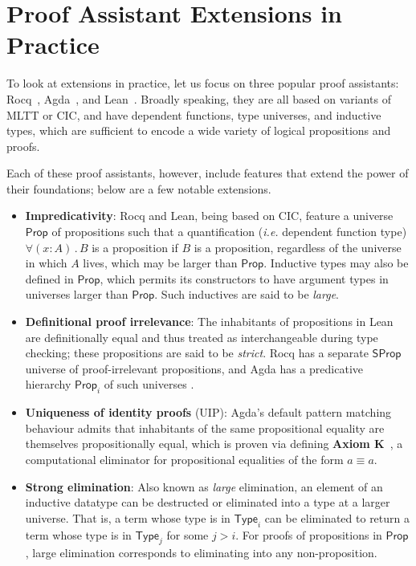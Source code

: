 \documentclass{article}
\makeatletter
\newcommand{\ie}{\textit{i.e.}\@\xspace}
\newcommand{\kw}[1]{\mathsf{#1}}
\makeatother
\begin{document}
\section{Proof Assistant Extensions in Practice} \label{sec:extensions}

To look at extensions in practice,
let us focus on three popular proof assistants:
Rocq~\citep{coq}, Agda~\citep{agda}, and Lean~\citep{lean}.
Broadly speaking, they are all based on variants of MLTT or CIC,
and have dependent functions, type universes, and inductive types,
which are sufficient to encode a wide variety of logical propositions and proofs.

Each of these proof assistants, however,
include features that extend the power of their foundations;
below are a few notable extensions.

\begin{itemize}[noitemsep,topsep=0pt]
  \item \textbf{Impredicativity}: Rocq and Lean, being based on CIC,
    feature a universe $\kw{Prop}$ of propositions such that
    a quantification (\ie dependent function type) $\forall (x : A) \mathpunct{.} B$
    is a proposition if $B$ is a proposition,
    regardless of the universe in which $A$ lives,
    which may be larger than $\kw{Prop}$.
    Inductive types may also be defined in $\kw{Prop}$,
    which permits its constructors to have argument types
    in universes larger than $\kw{Prop}$.
    Such inductives are said to be \emph{large}.
  \item \textbf{Definitional proof irrelevance}:
    The inhabitants of propositions in Lean are definitionally equal
    and thus treated as interchangeable during type checking;
    these propositions are said to be \emph{strict}.
    Rocq has a separate $\kw{SProp}$ universe of proof-irrelevant propositions,
    and Agda has a predicative hierarchy $\kw{Prop}_i$ of such universes \citep{sprop}.
  \item \textbf{Uniqueness of identity proofs} (UIP):
    Agda's default pattern matching behaviour admits
    that inhabitants of the same propositional equality
    are themselves propositionally equal,
    which is proven via defining \textbf{Axiom K}~\citep{axiomk},
    a computational eliminator for propositional equalities of the form $a \equiv a$.
  \item \textbf{Strong elimination}:
    Also known as \emph{large} elimination,
    an element of an inductive datatype can be destructed or eliminated
    into a type at a larger universe.
    That is, a term whose type is in $\kw{Type}_i$
    can be eliminated to return a term whose type is in $\kw{Type}_j$
    for some $j > i$.
    For proofs of propositions in $\kw{Prop}$,
    large elimination corresponds to eliminating into any non-proposition.
\end{itemize}
\end{document}

